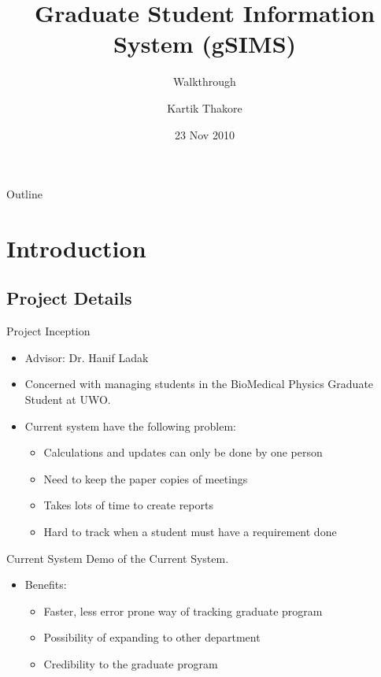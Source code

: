 \documentclass{beamer}
\title[Project Title] %
{Graduate Student Information System (gSIMS) }
\subtitle
{Walkthrough} %
\author[Author] %
{Kartik Thakore\inst{1}}
\institute[University Information] %
{
	\inst{1}%
		Department of Software Engineering\\
		University of Western Ontario
}
\date[Date] %
{23 Nov 2010}
\begin{document}
\begin{frame}
\titlepage
\end{frame}

\begin{frame}{Outline}
\tableofcontents
\end{frame}




\section{Introduction}

\subsection[Project Details]{Project Details}
\begin{frame}{Project Inception}

\begin{itemize}
\item
Advisor: Dr. Hanif Ladak
\item
Concerned with managing students in the BioMedical Physics Graduate Student at UWO.
\item 
Current system have the following problem:
\begin{itemize}
\item 
Calculations and updates can only be done by one person
\item
Need to keep the paper copies of meetings
\item 
Takes lots of time to create reports
\item 
Hard to track when a student must have a requirement done
\end{itemize}
\end{itemize}
\end{frame}
\begin{frame}{Current System}
Demo of the Current System.
\begin{itemize}
\item Benefits: 
\begin{itemize}
\item Faster, less error prone way of tracking graduate program
\item Possibility of expanding to other department
\item Credibility to the graduate program 
\end{itemize}
\end{itemize}
\end{frame}
\end{document}
